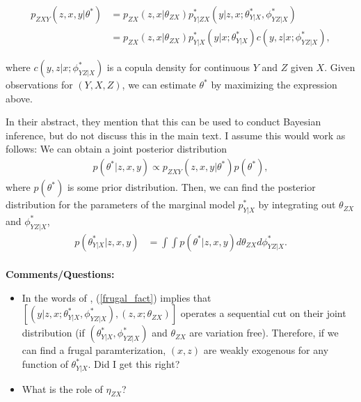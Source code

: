 \documentclass[10pt]{article}
\begin{document}
\begin{align} \label{frugal_fact}
	p_{ZXY}(z, x, y | \theta^*) &= p_{ZX}(z, x | \theta_{ZX}) p_{Y|ZX}^*(y|z, x; \theta_{Y|X}^*, \phi_{YZ | X}^*) \\
	&= p_{ZX}(z, x | \theta_{ZX}) p_{Y|X}^*(y | x; \theta_{Y|X}^*) c(y, z| x; \phi_{YZ | X}^*),
\end{align}

where $c(y, z | x; \phi_{YZ | X}^*)$ is a copula density for continuous $Y$ and $Z$ given $X$. Given observations for $(Y, X, Z)$, we can estimate $\theta^*$ by maximizing the expression above.

In their abstract, they mention that this can be used to conduct Bayesian inference, but do not discuss this in the main text. I assume this would work as follows: We can obtain a joint posterior distribution
\begin{align*}
	p(\theta^* | z, x, y) \propto p_{ZXY}(z, x, y | \theta^*) p(\theta^*),
\end{align*}
where $p(\theta^*)$ is some prior distribution. Then, we can find the posterior distribution for the parameters of the marginal model $p_{Y|X}^*$ by integrating out $\theta_{ZX}$ and $\phi_{YZ | X}^*$,
\begin{align*}
	p(\theta_{Y|X}^* | z, x, y) &= \int \int p(\theta^* | z, x, y) d\theta_{ZX} d\phi_{YZ | X}^*.
\end{align*} \\


\textbf{Comments/Questions:}
\begin{itemize}
	\item In the words of \cite{engle1983}, (\ref{frugal_fact}) implies that $[(y|z, x; \theta_{Y|X}^*, \phi_{YZ | X}^*), (z, x ;  \theta_{ZX})]$ operates a sequential cut on their joint distribution (if $(\theta_{Y|X}^*, \phi_{YZ | X}^*)$ and $\theta_{ZX}$ are variation free). Therefore, if we can find a frugal paramterization, $(x, z)$ are weakly exogenous for any function of $\theta_{Y|X}^*$. Did I get this right?
	\item What is the role of $\eta_{ZX}$?
\end{itemize}






\end{document}
